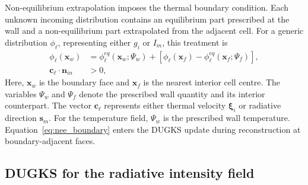 \documentclass[a4paper,12pt]{ctexart}
\numberwithin{equation}{section}
\newcommand{\vb}[1]{\bm{#1}}
\newcommand{\vx}{\vb{x}}
\newcommand{\vn}{\vb{n}}
\newcommand{\vs}{\vb{s}}
\newcommand{\vc}{\vb{c}}
\newcommand{\vxi}{\bm{\xi}}
\begin{document}
Non-equilibrium extrapolation imposes the thermal boundary condition. Each unknown incoming distribution contains an equilibrium part prescribed at the wall and a non-equilibrium part extrapolated from the adjacent cell. For a generic distribution $\phi_\ell$, representing either $g_i$ or $I_m$, this treatment is
\begin{equation}
\begin{aligned}
\phi_\ell(\vx_w)&=\phi_\ell^{eq}(\vx_w;\Psi_w)+\left[\phi_\ell(\vx_f)-\phi_\ell^{eq}(\vx_f;\Psi_f)\right],
\\
\vc_\ell\cdot\vn_{in}&>0,
\end{aligned}
\label{eq:nee_boundary}
\end{equation}
Here, $\vx_w$ is the boundary face and $\vx_f$ is the nearest interior cell centre. The variables $\Psi_w$ and $\Psi_f$ denote the prescribed wall quantity and its interior counterpart. The vector $\vc_\ell$ represents either thermal velocity $\vxi_i$ or radiative direction $\vs_m$. For the temperature field, $\Psi_w$ is the prescribed wall temperature. Equation~\eqref{eq:nee_boundary} enters the DUGKS update during reconstruction at boundary-adjacent faces.

\subsection{DUGKS for the radiative intensity field}
\label{subsec:radiation_dugks}
\end{document}
